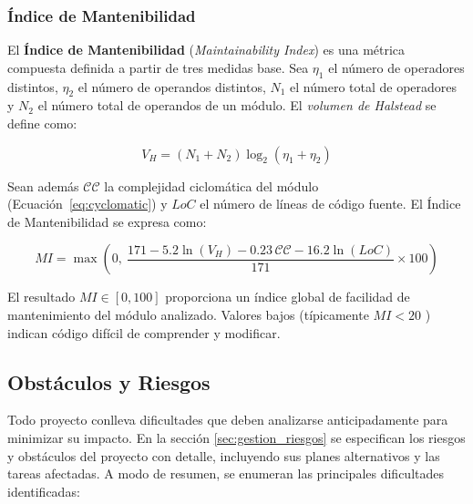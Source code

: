 \documentclass[11pt, letterpaper]{article}
\begin{document}
\subsubsection{Índice de Mantenibilidad}

El \textbf{Índice de Mantenibilidad} (\textit{Maintainability Index}) \cite{oman_maintainability_1992,microsoft_maintainability_index} es una métrica compuesta definida a partir de tres medidas base. Sea $\eta_1$ el número de operadores distintos, $\eta_2$ el número de operandos distintos, $N_1$ el número total de operadores y $N_2$ el número total de operandos de un módulo. El \textit{volumen de Halstead} \cite{halstead_1977} se define como:

\begin{equation}
    V_H = (N_1 + N_2)\log_2(\eta_1 + \eta_2)
    \label{eq:halstead_volume}
\end{equation}

Sean además $\mathcal{CC}$ la complejidad ciclomática del módulo (Ecuación~\ref{eq:cyclomatic}) y $\mathit{LoC}$ el número de líneas de código fuente. El Índice de Mantenibilidad se expresa como:

\begin{equation}
    \mathit{MI} = \max\!\left(0,\ \frac{171 - 5.2\ln(V_H) - 0.23\,\mathcal{CC} - 16.2\ln(\mathit{LoC})}{171} \times 100\right)
    \label{eq:mi}
\end{equation}

\noindent El resultado $\mathit{MI} \in [0, 100]$ proporciona un índice global de facilidad de mantenimiento del módulo analizado. Valores bajos (típicamente $\mathit{MI} < 20$ \cite{microsoft_maintainability_index}) indican código difícil de comprender y modificar.

\subsection{Obstáculos y Riesgos}
\label{sec:obstaculos_riesgos}
Todo proyecto conlleva dificultades que deben analizarse anticipadamente para minimizar su impacto. En la sección \ref{sec:gestion_riesgos} se especifican los riesgos y obstáculos del proyecto con detalle, incluyendo sus planes alternativos y las tareas afectadas. A modo de resumen, se enumeran las principales dificultades identificadas:
\end{document}
